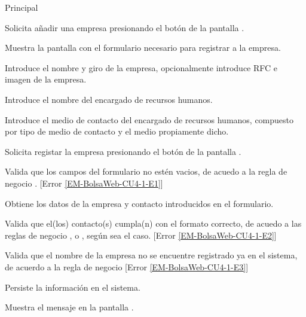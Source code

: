 \begin{UCtrayectoria}{Principal}

	\UCpaso [\UCactor] Solicita añadir una empresa presionando el botón  de la pantalla . 

	\UCpaso Muestra la pantalla  con el formulario necesario para registrar a la empresa. \label{EM-BolsaWeb-CU4-1-DatosObligatorios}

	\UCpaso [\UCactor] Introduce el nombre y giro de la empresa, opcionalmente introduce RFC e imagen de la empresa. 

	\UCpaso [\UCactor] Introduce el nombre del encargado de recursos humanos.

	\UCpaso [\UCactor] Introduce el medio de contacto del encargado de recursos humanos, compuesto por tipo de medio de contacto y el medio propiamente dicho. \label{EM-BolsaWeb-CU4-1-AgregarContacto}

	\UCpaso [\UCactor] Solicita registar la empresa presionando el botón  de la pantalla .   

	\UCpaso Valida que los campos del formulario no estén vacios, de acuedo a la regla de negocio . [Error \ref{EM-BolsaWeb-CU4-1-E1}] 

	\UCpaso Obtiene los datos de la empresa y contacto introducidos en el formulario. 

	\UCpaso Valida que el(los) contacto(s) cumpla(n) con el formato correcto, de acuedo a las reglas de negocio ,  o , según sea el caso. [Error \ref{EM-BolsaWeb-CU4-1-E2}] 

	\UCpaso Valida que el nombre de la empresa no se encuentre registrado ya en el sistema, de acuerdo a la regla de negocio  [Error \ref{EM-BolsaWeb-CU4-1-E3}] 
	
	\UCpaso Persiste la información en el sistema.

	\UCpaso Muestra el mensaje  en la pantalla . 
\end{UCtrayectoria}

